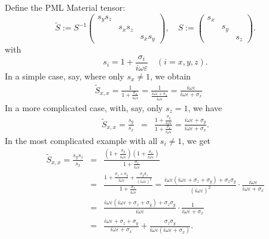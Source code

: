 
Define the PML Material tensor:
\[ \tilde{S} := S^{- 1} \left(\begin{array}{ccc}
     s_y s_z &  & \\
     & s_x s_z & \\
     &  & s_x s_y
   \end{array}\right), \quad S := \left(\begin{array}{ccc}
     s_x &  & \\
     & s_y & \\
     &  & s_z
   \end{array}\right) . \]
with
\[ s_i = 1 + \frac{\sigma_i}{i \omega \varepsilon} \quad (i = x, y, z) . \]
In a simple case, say, where only $s_x \neq 1$, we obtain
\begin{eqnarray*}
  \tilde{S}_{x, x} = \frac{1}{1 + \frac{\sigma_x}{i \omega \varepsilon}} =
  \frac{1}{\frac{i \omega \varepsilon + \sigma_x}{i \omega \varepsilon}} =
  \frac{i \omega \varepsilon}{i \omega \varepsilon + \sigma_x} &  &
\end{eqnarray*}
In a more complicated case, with, say, only $s_z = 1$, we have
\begin{eqnarray*}
  \tilde{S}_{x, x} = \frac{s_y}{s_x} & = & \frac{1 + \frac{\sigma_y}{i \omega
  \varepsilon}}{1 + \frac{\sigma_x}{i \omega \varepsilon}} = \frac{i \omega
  \varepsilon + \sigma_y}{i \omega \varepsilon + \sigma_x} .
\end{eqnarray*}
In the most complicated example with all $s_i \neq 1$, we get
\begin{eqnarray*}
  \tilde{S}_{x, x} = \frac{s_y s_z}{s_x} & = & \frac{\left( 1 +
  \frac{\sigma_y}{i \omega \varepsilon} \right) \left( 1 + \frac{\sigma_z}{i
  \omega \varepsilon} \right)}{1 + \frac{\sigma_x}{i \omega \varepsilon}}\\
  & = & \frac{1 + \frac{\sigma_z + \sigma_y}{i \omega \varepsilon} +
  \frac{\sigma_y \sigma_z}{(i \omega \varepsilon)^2}}{1 + \frac{\sigma_x}{i
  \omega \varepsilon}} = \frac{i \omega \varepsilon (i \omega \varepsilon +
  \sigma_z + \sigma_y) + \sigma_z \sigma_y}{(i \omega \varepsilon)^2} \cdot
  \frac{i \omega \varepsilon}{i \omega \varepsilon + \sigma_x}\\
  & = & \frac{i \omega \varepsilon (i \omega \varepsilon + \sigma_z +
  \sigma_y) + \sigma_z \sigma_y}{i \omega \varepsilon} \cdot \frac{1}{i \omega
  \varepsilon + \sigma_x}\\
  & = & \frac{i \omega \varepsilon + \sigma_z + \sigma_y}{i \omega
  \varepsilon + \sigma_x} + \frac{\sigma_z \sigma_y}{i \omega \varepsilon (i
  \omega \varepsilon + \sigma_x)} .
\end{eqnarray*}

